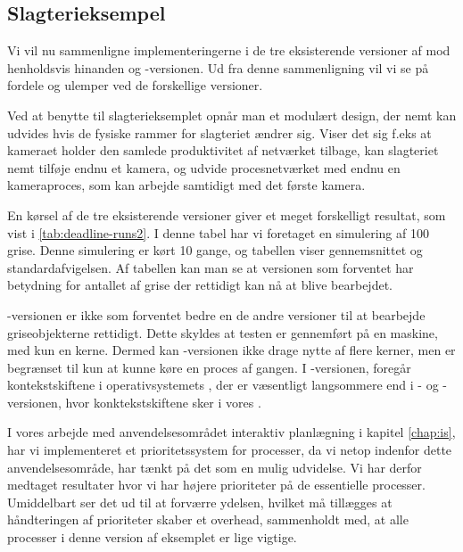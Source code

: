\subsection{Slagterieksempel}
Vi vil nu sammenligne implementeringerne i de tre eksisterende versioner af \pycsp mod henholdsvis hinanden og -versionen. Ud fra denne sammenligning vil vi se på fordele og ulemper ved de forskellige versioner.

Ved at benytte \pycsp til slagterieksemplet opnår man et modulært design, der nemt kan udvides hvis de fysiske rammer for slagteriet ændrer sig. Viser det sig f.eks at kameraet holder den samlede produktivitet af netværket tilbage, kan slagteriet nemt tilføje endnu et kamera, og udvide procesnetværket med endnu en kameraproces, som kan arbejde samtidigt med det første kamera. 

En kørsel af de tre eksisterende versioner giver et meget forskelligt resultat, som vist i \cref{tab:deadline-runs2}. I denne tabel har vi foretaget en simulering af 100 grise. Denne simulering er kørt 10 gange, og tabellen viser gennemsnittet og standardafvigelsen. Af tabellen kan man se at versionen som forventet har betydning for antallet af grise der rettidigt kan nå at blive bearbejdet. 

-versionen er ikke som forventet bedre en de andre versioner til at bearbejde griseobjekterne rettidigt. Dette skyldes at testen er gennemført på en maskine, med kun en kerne.  Dermed kan -versionen ikke drage nytte  af flere kerner, men er begrænset til kun at kunne køre en proces af gangen. I -versionen, foregår kontekstskiftene i operativsystemets \sched, der er væsentligt langsommere end i - og -versionen, hvor konktekstskiftene sker i vores \sched. 

I vores arbejde med anvendelsesområdet interaktiv planlægning i kapitel \ref{chap:is}, har vi implementeret et prioritetssystem for processer, da vi netop indenfor dette anvendelsesområde, har tænkt på det som en mulig udvidelse. Vi har derfor medtaget resultater hvor vi har højere prioriteter på de essentielle processer. Umiddelbart ser det ud til at forværre ydelsen, hvilket må tillægges at håndteringen af prioriteter skaber et overhead, sammenholdt med, at alle processer i denne version af eksemplet er lige vigtige. 


